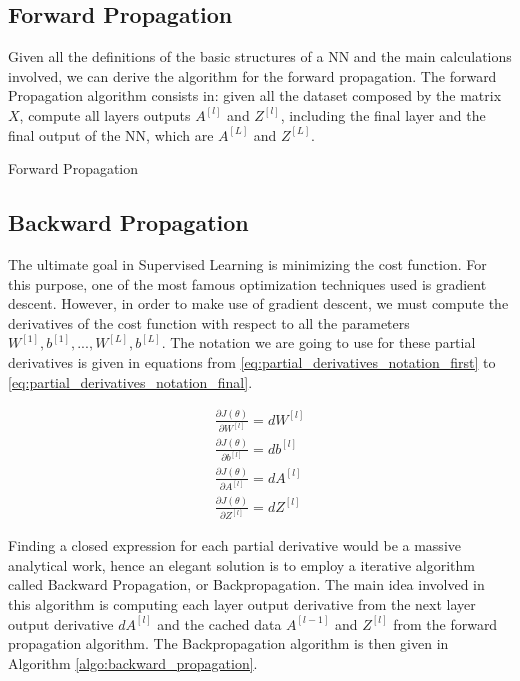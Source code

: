 \subsection{Forward Propagation}

Given all the definitions of the basic structures of a NN and the main calculations involved, we can derive the algorithm for the forward propagation. The forward Propagation algorithm consists in: given all the dataset composed by the matrix $X$, compute all layers outputs $A^{[l]}$ and $Z^{[l]}$, including the final layer and the final output of the NN, which are $A^{[L]}$ and $Z^{[L]}$.

\begin{algorithm}[H]
    \DontPrintSemicolon
    \SetAlgoLined
    \caption{Forward Propagation}
    \label{algo:forward_propagation}
\end{algorithm}

\subsection{Backward Propagation}

The ultimate goal in Supervised Learning is minimizing the cost function. For this purpose, one of the most famous optimization techniques used is gradient descent. However, in order to make use of gradient descent, we must compute the derivatives of the cost function with respect to all the parameters $W^{[1]}, b^{[1]}, ..., W^{[L]}, b^{[L]}$. The notation we are going to use for these partial derivatives is given in equations from \ref{eq:partial_derivatives_notation_first} to \ref{eq:partial_derivatives_notation_final}.

\begin{align}
\frac{\partial J(\theta)}{\partial W^{[l]}} = dW^{[l]}
\label{eq:partial_derivatives_notation_first}
\\
\frac{\partial J(\theta)}{\partial b^{[l]}} = db^{[l]} \\
\frac{\partial J(\theta)}{\partial A^{[l]}} = dA^{[l]} \\
\frac{\partial J(\theta)}{\partial Z^{[l]}} = dZ^{[l]}
\label{eq:partial_derivatives_notation_final}
\end{align}

Finding a closed expression for each partial derivative would be a massive analytical work, hence an elegant solution is to employ a iterative algorithm called Backward Propagation, or Backpropagation. The main idea involved in this algorithm is computing each layer output derivative from the next layer output derivative $dA^{[l]}$ and the cached data $A^{[l-1]}$ and $Z^{[l]}$ from the forward propagation algorithm. The Backpropagation algorithm is then given in Algorithm \ref{algo:backward_propagation}.

